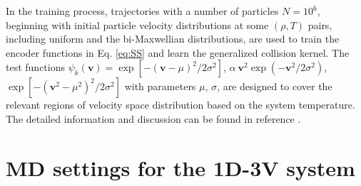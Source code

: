 \documentclass[preprint,1p,times]{elsarticle}
\theoremstyle{definition}
\theoremstyle{remark}
\begin{document}
In the training process, trajectories with a number of particles $N=10^{6}$, beginning with initial particle velocity distributions at some $(\rho,T)$ pairs, including uniform and the bi-Maxwellian distributions, are used to train the encoder functions in Eq. \eqref{eq:SS} and learn the generalized collision kernel.
The test functions $\psi_{k}(\bm{v}) = \exp[-(\boldsymbol{v}-\mu)^2/2\sigma^{2}]$, $\alpha~\boldsymbol{v}^2 \exp(-\boldsymbol{v}^2/2\sigma^{2})$, $\exp[-(\boldsymbol{v}^2 - \mu^{2})^2/2\sigma^{2}]$ with parameters $\mu$, $\sigma$, are designed to cover the relevant regions of velocity space distribution based on the system temperature.
The detailed information and discussion can be found in reference \cite{zhao2025fast}.



\section{MD settings for the 1D-3V system} 
\label{app:MD}
\end{document}
